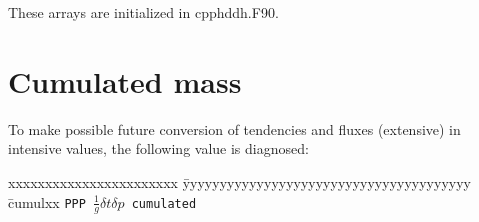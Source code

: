 \noi These arrays are initialized in cpphddh.F90.

\section{Cumulated mass}

To make possible future conversion of tendencies and fluxes (extensive) in intensive values, the following value is diagnosed:
\begin{tabbing}
xxxxxxxxxxxxxxxxxxxxxxx \= yyyyyyyyyyyyyyyyyyyyyyyyyyyyyyyyyyyyyyy \= cumulxx \kill
\tt PPP \> $\frac{1}{g}\delta t \delta p$ \> cumulated\\[1ex]
\end{tabbing}

